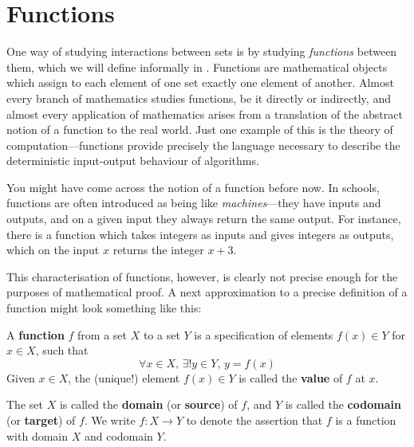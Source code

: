 \section{Functions}

One way of studying interactions between sets is by studying \textit{functions} between them, which we will define informally in . Functions are mathematical objects which assign to each element of one set exactly one element of another. Almost every branch of mathematics studies functions, be it directly or indirectly, and almost every application of mathematics arises from a translation of the abstract notion of a function to the real world. Just one example of this is the theory of computation---functions provide precisely the language necessary to describe the deterministic input-output behaviour of algorithms.

You might have come across the notion of a function before now. In schools, functions are often introduced as being like \textit{machines}---they have inputs and outputs, and on a given input they always return the same output. For instance, there is a function which takes integers as inputs and gives integers as outputs, which on the input $x$ returns the integer $x+3$.

This characterisation of functions, however, is clearly not precise enough for the purposes of mathematical proof. A next approximation to a precise definition of a function might look something like this:

\begin{definition}
\label{defFunction}
A \textbf{function} $f$ from a set $X$ to a set $Y$ is a specification of elements $f(x) \in Y$ for $x \in X$, such that
\[ \forall x \in X,\, \exists ! y \in Y,\, y = f(x) \]
Given $x \in X$, the (unique!) element $f(x) \in Y$ is called the \textbf{value} of $f$ at $x$.

The set $X$ is called the \textbf{domain} (or \textbf{source}) of $f$, and $Y$ is called the \textbf{codomain} (or \textbf{target}) of $f$. We write $f : X \to Y$  to denote the assertion that $f$ is a function with domain $X$ and codomain $Y$.
\end{definition}

